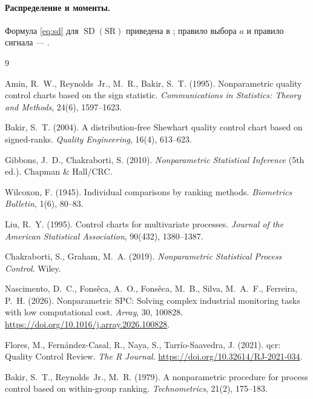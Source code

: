 \documentclass[11pt,a4paper]{article}
\newcommand{\SR}{\mathrm{SR}}
\newcommand{\SD}{\operatorname{SD}}
\begin{document}
\paragraph{Распределение и моменты.} Формула \eqref{eq:sd} для $\SD(\SR)$
приведена в \cite[с.~200, табл.~4.3]{Chakraborti2019}; правило выбора $a$
и правило сигнала --- \cite[\S4.2.1.2, с.~196--202]{Chakraborti2019}.

\begin{thebibliography}{9}

Amin, R.~W., Reynolds~Jr., M.~R., Bakir, S.~T. (1995).
Nonparametric quality control charts based on the sign statistic.
\emph{Communications in Statistics: Theory and Methods}, 24(6), 1597--1623.

Bakir, S.~T. (2004).
A distribution-free Shewhart quality control chart based on signed-ranks.
\emph{Quality Engineering}, 16(4), 613--623.

Gibbons, J.~D., Chakraborti, S. (2010).
\emph{Nonparametric Statistical Inference} (5th ed.). Chapman \& Hall/CRC.

Wilcoxon, F. (1945).
Individual comparisons by ranking methods.
\emph{Biometrics Bulletin}, 1(6), 80--83.

Liu, R.~Y. (1995).
Control charts for multivariate processes.
\emph{Journal of the American Statistical Association}, 90(432), 1380--1387.

Chakraborti, S., Graham, M.~A. (2019).
\emph{Nonparametric Statistical Process Control}. Wiley.

Nascimento, D.~C., Fons\^eca, A.~O., Fons\^eca, M.~B., Silva, M.~A.~F.,
Ferreira, P.~H. (2026).
Nonparametric SPC: Solving complex industrial monitoring tasks with low
computational cost. \emph{Array}, 30, 100828.
\url{https://doi.org/10.1016/j.array.2026.100828}.

Flores, M., Fern\'andez-Casal, R., Naya, S., Tarr\'io-Saavedra, J. (2021).
qcr: Quality Control Review. \emph{The R Journal}.
\url{https://doi.org/10.32614/RJ-2021-034}.

Bakir, S.~T., Reynolds~Jr., M.~R. (1979).
A nonparametric procedure for process control based on within-group ranking.
\emph{Technometrics}, 21(2), 175--183.

\end{thebibliography}
\end{document}
